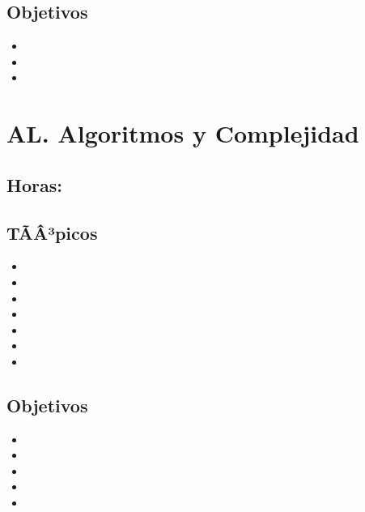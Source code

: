 \subsection*{Objetivos}
\begin{itemize}
	\item \PFCINCOObjUNO
	\item \PFCINCOObjDOS
	\item \PFCINCOObjTRES
\end{itemize}

\section{AL. Algoritmos y Complejidad}\label{sec:BOK-AL}

\subsection{\ALUNODef}\label{sec:BOK-AL1}
\subsection*{Horas: \ALUNOHours}

\subsection*{TÃÂ³picos}
\begin{itemize}
	\item \ALUNOTopicAnalisis
	\item \ALUNOTopicIdentificar
	\item \ALUNOTopicNotacion
	\item \ALUNOTopicClases
	\item \ALUNOTopicMedidas
	\item \ALUNOTopicCambios
	\item \ALUNOTopicUsar
\end{itemize}

\subsection*{Objetivos}
\begin{itemize}
	\item \ALUNOObjUNO
	\item \ALUNOObjDOS
	\item \ALUNOObjTRES
	\item \ALUNOObjCUATRO
	\item \ALUNOObjCINCO
\end{itemize}


